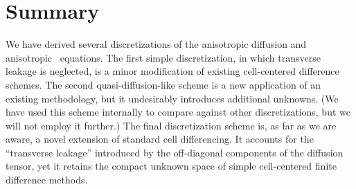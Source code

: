 \section{Summary}

We have derived several discretizations of the anisotropic diffusion and
anisotropic \Pone\ equations. The first simple discretization, in which
transverse
leakage is neglected, is a minor modification of existing cell-centered
difference schemes. The second quasi-diffusion-like scheme is a new application
of an existing methodology, but it undesirably introduces additional unknowns.
(We have used this scheme internally to compare against other discretizations,
but we will not employ it further.)
The final discretization scheme is, as far as we are aware, a novel extension of
standard cell differencing. It accounts for the ``transverse leakage''
introduced by the off-diagonal components of the diffusion tensor, yet it
retains the compact unknown space of simple cell-centered finite difference
methods.

